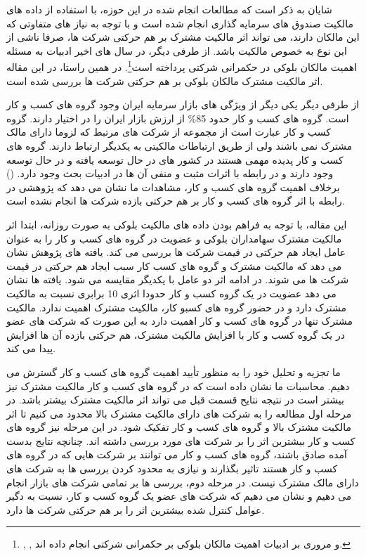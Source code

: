    شایان به ذکر است که مطالعات انجام شده در این حوزه، با استفاده از داده های مالکیت صندوق های سرمایه گذاری انجام شده است و با توجه به نیاز های متفاوتی که این مالکان دارند، می تواند اثر مالکیت مشترک بر هم حرکتی شرکت ها، صرفا ناشی از این نوع به خصوص مالکیت باشد. از طرفی دیگر، در سال های اخیر ادبیات به مسئله اهمیت مالکان بلوکی در حکمرانی شرکتی پرداخته است\footnote{
   , , و 
     مروری  بر ادبیات اهمیت مالکان بلوکی بر حکمرانی شرکتی انجام داده اند.}.
     در همین راستا، در این مقاله اثر مالکیت مشترک مالکان بلوکی بر هم حرکتی شرکت ها بررسی شده است. 
 
 از طرفی دیگر  یکی دیگر از ویژگی های بازار سرمایه ایران وجود گروه های کسب و کار است. گروه های کسب و کار حدود 85\% از ارزش بازار ایران را در اختیار دارند. گروه کسب و کار عبارت است از مجموعه از شرکت های مرتبط که لزوما دارای مالک مشترک نمی باشند ولی از طریق ارتباطات مالکیتی به یکدیگر ارتباط دارند. گروه های کسب و کار پدیده مهمی هستند در کشور های در حال توسعه یافته و در حال توسعه وجود دارند و در رابطه با اثرات مثبت و منفی آن ها در ادبیات بحث وجود دارد. 
 ()
برخلاف اهمیت گروه های کسب و کار، مشاهدات ما نشان می دهد که پژوهشی در رابطه با اثر گروه های کسب و کار بر هم حرکتی بازده شرکت ها انجام نشده است. 

این مقاله، با توجه به فراهم بودن داده های مالکیت بلوکی به صورت روزانه، ابتدا اثر مالکیت مشترک سهامداران بلوکی و عضویت در گروه های کسب و کار را به عنوان عامل ایجاد هم حرکتی در قیمت شرکت ها بررسی می کند. یافته های پژوهش نشان می دهد که مالکیت مشترک و گروه های کسب کار سبب ایجاد هم حرکتی در قیمت شرکت ها می شوند. در ادامه اثر دو عامل با یکدیگر مقایسه می شود. یافته ها نشان می دهد عضویت در یک گروه کسب و کار حدودا اثری 10 برابری نسبت به مالکیت مشترک دارد و در حضور گروه های کسبو کار، مالکیت مشترک اهمیت ندارد. مالکیت مشترک تنها در گروه های کسب و کار اهمیت دارد به این صورت که شرکت های عضو در یک گروه کسب و کار با افزایش مالکیت مشترک، هم حرکتی بازده آن ها افزایش پیدا می کند.

ما تجزیه و تحلیل خود را به منظور تأیید اهمیت گروه های کسب و کار گسترش می دهیم.  محاسبات ما نشان داده است که در گروه های کسب و کار مالکیت مشترک نیز بیشتر است در نتیجه نتایح قسمت قبل می تواند اثر مالکیت مشترک بیشتر باشد. در مرحله اول مطالعه را به شرکت های دارای مالکیت مشترک بالا محدود می کنیم تا اثر مالکیت مشترک بالا و گروه های کسب و کار تفکیک شود. در این مرحله نیز گروه های کسب و کار بیشترین اثر را بر شرکت های مورد بررسی داشته اند. چنانچه نتایج بدست آمده صادق باشند، گروه های کسب و کار می توانند بر شرکت هایی که در گروه های کسب و کار هستند تاثیر بگذارند و نیازی به محدود کردن بررسی ها به شرکت های دارای مالک مشترک نیست. در مرحله دوم، بررسی ها بر تمامی شرکت های بازار انجام می دهیم و نشان می دهیم که شرکت های عضو یک گروه کسب و کار، نسبت به دگیر عوامل کنترل شده بیشترین اثر را بر هم حرکتی شرکت ها دارد.

